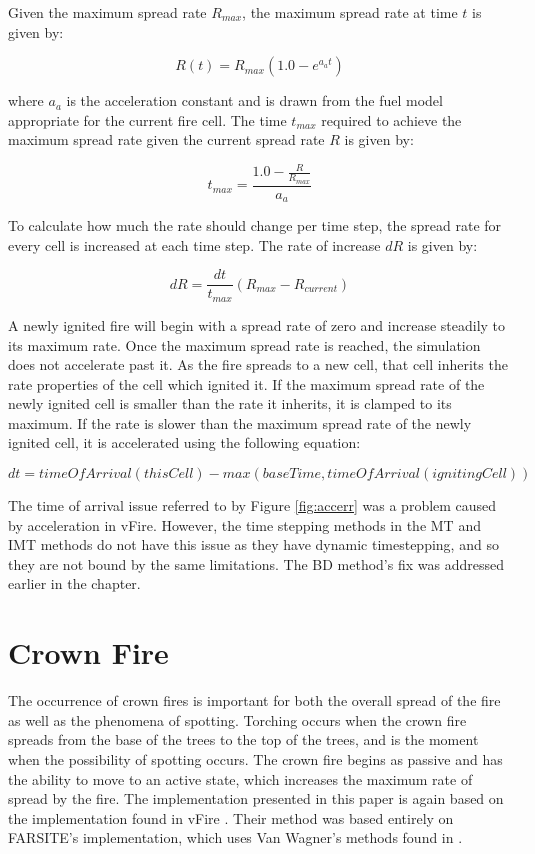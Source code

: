 Given the maximum spread rate $R_{max}$, the maximum spread rate at time $t$ is given by: 

\begin{equation}
R(t) = R_{max}(1.0 - e^{a_at})
\label{eq:R(t)}
\end{equation}

where $a_a$ is the acceleration constant and is drawn from the fuel model appropriate for the current fire cell. The time $t_{max}$ required to achieve the maximum spread rate given the current spread rate $R$ is given by: 

\begin{equation}
t_{max} = \frac{1.0 - \frac{R}{R_{max}}}{a_a}
\end{equation}

To calculate how much the rate should change per time step, the spread rate for every cell is increased at each time step. The rate of increase $dR$ is given by: 

\begin{equation}
dR = \frac{dt}{t_{max}}(R_{max} - R_{current})
\end{equation}

A newly ignited fire will begin with a spread rate of zero and increase steadily to its maximum rate. Once the maximum spread rate is reached, the simulation does not accelerate past it. As the fire spreads to a new cell, that cell inherits the rate properties of the cell which ignited it. If the maximum spread rate of the newly ignited cell is smaller than the rate it inherits, it is clamped to its maximum. If the rate is slower than the maximum spread rate of the newly ignited cell, it is accelerated using the following equation: 

\begin{equation}
dt = timeOfArrival(thisCell) - max(baseTime, timeOfArrival(ignitingCell))
\end{equation}

The time of arrival issue referred to by Figure \ref{fig:accerr} was a problem caused by acceleration in vFire. However, the time stepping methods in the MT and IMT methods do not have this issue as they have dynamic timestepping, and so they are not bound by the same limitations. The BD method's fix was addressed earlier in the chapter. 

\section{Crown Fire}
The occurrence of crown fires is important for both the overall spread of the fire as well as the phenomena of spotting. Torching occurs when the crown fire spreads from the base of the trees to the top of the trees, and is the moment when the possibility of spotting occurs. The crown fire begins as passive and has the ability to move to an active state, which increases the maximum rate of spread by the fire. The implementation presented in this paper is again based on the implementation found in vFire \cite{vFire}. Their method was based entirely on FARSITE's implementation, which uses Van Wagner's methods found in \cite{wagner1977,wagner1993}. 

